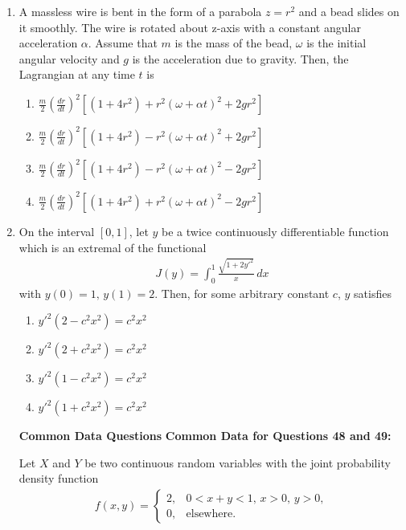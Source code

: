 \documentclass[journal]{IEEEtran}
\numberwithin{equation}{enumi}
\numberwithin{figure}{enumi}
\begin{document}
\begin{enumerate}
 

\item A massless wire is bent in the form of a parabola \( z = r^2 \) and a bead slides on it smoothly. The wire is rotated about z-axis with a constant angular acceleration \(\alpha\). Assume that \( m \) is the mass of the bead, \(\omega\) is the initial angular velocity and \( g \) is the acceleration due to gravity. Then, the Lagrangian at any time \( t \) is
   \hfill{}

\begin{enumerate}
    \item $\frac{m}{2} \left( \frac{dr}{dt} \right)^2 \left[ (1+4r^2) + r^2 (\omega + \alpha t)^2 + 2g r^2 \right]$
    \item $\frac{m}{2} \left( \frac{dr}{dt} \right)^2 \left[ (1+4r^2) - r^2 (\omega + \alpha t)^2 + 2g r^2 \right]$
    \item $\frac{m}{2} \left( \frac{dr}{dt} \right)^2 \left[ (1+4r^2) - r^2 (\omega + \alpha t)^2 - 2g r^2 \right]$
    \item $\frac{m}{2} \left( \frac{dr}{dt} \right)^2 \left[ (1+4r^2) + r^2 (\omega + \alpha t)^2 - 2g r^2 \right]$
\end{enumerate}



\item On the interval \([0,1]\), let \( y \) be a twice continuously differentiable function which is an extremal of the functional
\begin{align*}
J(y) = \int_0^1 \frac{\sqrt{1 + 2y'^2}}{x} \, dx
\end{align*}
with \( y(0) = 1, \, y(1) = 2 \). Then, for some arbitrary constant \( c \), \( y \) satisfies
 \hfill{}
\begin{multicols}{2}
\begin{enumerate}
\item  $y'^2 (2 - c^2 x^2 ) = c^2 x^2$
\item $y'^2 (2 + c^2 x^2 ) = c^2 x^2$
\item $y'^2 (1 - c^2 x^2 ) = c^2 x^2$
\item $y'^2 (1 + c^2 x^2 ) = c^2 x^2$
\end{enumerate}
\end{multicols}

\bigskip

\textbf{Common Data Questions}
\newline
\textbf{Common Data for Questions 48 and 49:}

Let $X$ and $Y$ be two continuous random variables with the joint probability density function
\begin{align*}
f(x, y) = 
\begin{cases}
2, & 0 < x + y < 1,\, x > 0,\, y > 0, \\
0, & \text{elsewhere}.
\end{cases}
\end{align*}



\end{enumerate}
\end{document}
